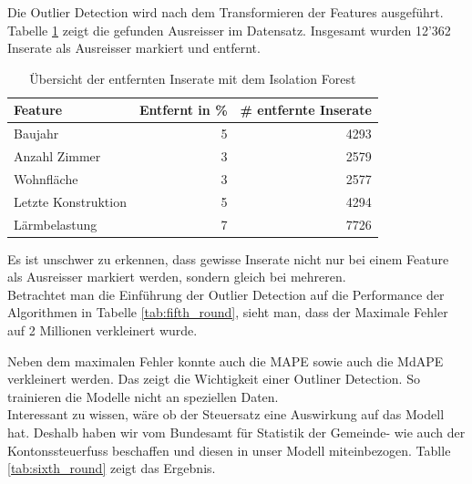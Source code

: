%
Die Outlier Detection wird nach dem Transformieren der Features ausgeführt. Tabelle \ref{tab:iso_forest} zeigt die gefunden Ausreisser im Datensatz. Insgesamt wurden 12'362 Inserate als Ausreisser markiert und entfernt.\\[2ex]
%
\begin{table}[ht]
\centering
{}
\begin{tabular}{@{}lrr@{}}
\toprule
Feature & Entfernt in \% & \# entfernte Inserate\\
\midrule
Baujahr & 5 & 4293\\
Anzahl Zimmer & 3 & 2579\\
Wohnfläche & 3 & 2577\\
Letzte Konstruktion & 5 & 4294\\
Lärmbelastung & 7 & 7726\\
\bottomrule
\end{tabular}
\caption{Übersicht der entfernten Inserate mit dem Isolation Forest}
\label{tab:iso_forest}
\end{table}
%
Es ist unschwer zu erkennen, dass gewisse Inserate nicht nur bei einem Feature als Ausreisser markiert werden, sondern gleich bei mehreren.\\[2ex]
%
Betrachtet man die Einführung der Outlier Detection auf die Performance der Algorithmen in Tabelle \ref{tab:fifth_round}, sieht man, dass der Maximale Fehler auf 2 Millionen verkleinert wurde.\\
%
\begin{table}[ht]
\centering
{}
\caption{Ergebnisse mit Einbezug einer Outlier Detection}
\label{tab:fifth_round}
\end{table}
%
Neben dem maximalen Fehler konnte auch die MAPE sowie auch die MdAPE verkleinert werden. Das zeigt die Wichtigkeit einer Outliner Detection. So trainieren die Modelle nicht an speziellen Daten.\\[2ex] 
%
Interessant zu wissen, wäre ob der Steuersatz eine Auswirkung auf das Modell hat. Deshalb haben wir vom Bundesamt für Statistik der Gemeinde- wie auch der Kontonssteuerfuss beschaffen und diesen in unser Modell miteinbezogen. Tablle \ref{tab:sixth_round} zeigt das Ergebnis.\\[2ex]
